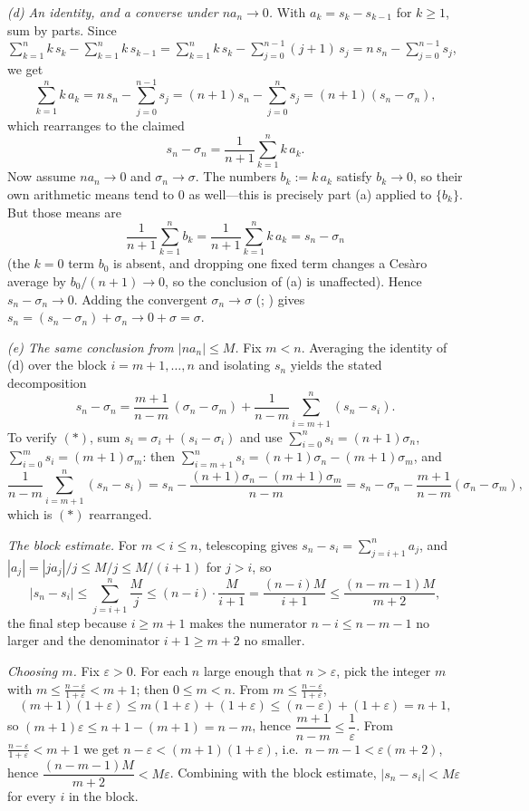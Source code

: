 \documentclass[main.tex]{subfiles}
\begin{document}
\begin{SolutionBlue}
\emph{(d) An identity, and a converse under $na_{n}\to 0$.} With $a_{k}=s_{k}-s_{k-1}$ for $k\ge 1$, sum
by parts. Since
$\sum_{k=1}^{n}k\,s_{k}-\sum_{k=1}^{n}k\,s_{k-1}=\sum_{k=1}^{n}k\,s_{k}-\sum_{j=0}^{n-1}(j+1)\,s_{j}
   =n\,s_{n}-\sum_{j=0}^{n-1}s_{j}$,
we get
\[
\sum_{k=1}^{n}k\,a_{k}=n\,s_{n}-\sum_{j=0}^{n-1}s_{j}=(n+1)s_{n}-\sum_{j=0}^{n}s_{j}=(n+1)(s_{n}-\sigma_{n}),
\]
which rearranges to the claimed
\[
s_{n}-\sigma_{n}=\frac{1}{n+1}\sum_{k=1}^{n}k\,a_{k}.
\]
Now assume $na_{n}\to 0$ and $\sigma_{n}\to\sigma$. The numbers $b_{k}:=k\,a_{k}$ satisfy $b_{k}\to 0$, so
their own arithmetic means tend to $0$ as well---this is precisely part (a) applied to $\{b_{k}\}$. But
those means are
\[
\frac{1}{n+1}\sum_{k=1}^{n}b_{k}=\frac{1}{n+1}\sum_{k=1}^{n}k\,a_{k}=s_{n}-\sigma_{n}
\]
(the $k=0$ term $b_{0}$ is absent, and dropping one fixed term changes a Ces\`aro average by
$b_{0}/(n+1)\to 0$, so the conclusion of (a) is unaffected). Hence $s_{n}-\sigma_{n}\to 0$. Adding the
convergent $\sigma_{n}\to\sigma$ (; ) gives
$s_{n}=(s_{n}-\sigma_{n})+\sigma_{n}\to 0+\sigma=\sigma$.

\emph{(e) The same conclusion from $|na_{n}|\le M$.} Fix $m<n$. Averaging the identity of (d) over the
block $i=m+1,\dots,n$ and isolating $s_{n}$ yields the stated decomposition
\[
s_{n}-\sigma_{n}=\frac{m+1}{n-m}\,(\sigma_{n}-\sigma_{m})+\frac{1}{n-m}\sum_{i=m+1}^{n}(s_{n}-s_{i}).
\tag{$\ast$}
\]
To verify $(\ast)$, sum $s_{i}=\sigma_{i}+(s_{i}-\sigma_{i})$ and use $\sum_{i=0}^{n}s_{i}=(n+1)\sigma_{n}$,
$\sum_{i=0}^{m}s_{i}=(m+1)\sigma_{m}$: then $\sum_{i=m+1}^{n}s_{i}=(n+1)\sigma_{n}-(m+1)\sigma_{m}$, and
\[
\frac{1}{n-m}\sum_{i=m+1}^{n}(s_{n}-s_{i})=s_{n}-\frac{(n+1)\sigma_{n}-(m+1)\sigma_{m}}{n-m}
   =s_{n}-\sigma_{n}-\frac{m+1}{n-m}(\sigma_{n}-\sigma_{m}),
\]
which is $(\ast)$ rearranged.

\emph{The block estimate.} For $m<i\le n$, telescoping gives
$s_{n}-s_{i}=\sum_{j=i+1}^{n}a_{j}$, and $|a_{j}|=|ja_{j}|/j\le M/j\le M/(i+1)$ for $j>i$, so
\[
|s_{n}-s_{i}|\le\sum_{j=i+1}^{n}\frac{M}{j}\le (n-i)\cdot\frac{M}{i+1}=\frac{(n-i)M}{i+1}
   \le\frac{(n-m-1)M}{m+2},
\]
the final step because $i\ge m+1$ makes the numerator $n-i\le n-m-1$ no larger and the denominator
$i+1\ge m+2$ no smaller.

\emph{Choosing $m$.} Fix $\varepsilon>0$. For each $n$ large enough that $n>\varepsilon$, pick the integer
$m$ with $m\le\frac{n-\varepsilon}{1+\varepsilon}<m+1$; then $0\le m<n$. From $m\le\frac{n-\varepsilon}{1+\varepsilon}$,
\[
(m+1)(1+\varepsilon)\le m(1+\varepsilon)+(1+\varepsilon)\le (n-\varepsilon)+(1+\varepsilon)=n+1,
\]
so $(m+1)\varepsilon\le n+1-(m+1)=n-m$, hence $\dfrac{m+1}{n-m}\le\dfrac1\varepsilon$. From $\frac{n-\varepsilon}{1+\varepsilon}<m+1$ we get
$n-\varepsilon<(m+1)(1+\varepsilon)$, i.e.\ $n-m-1<\varepsilon(m+2)$, hence
$\dfrac{(n-m-1)M}{m+2}<M\varepsilon$. Combining with the block estimate, $|s_{n}-s_{i}|<M\varepsilon$ for
every $i$ in the block.


\end{SolutionBlue}
\end{document}
